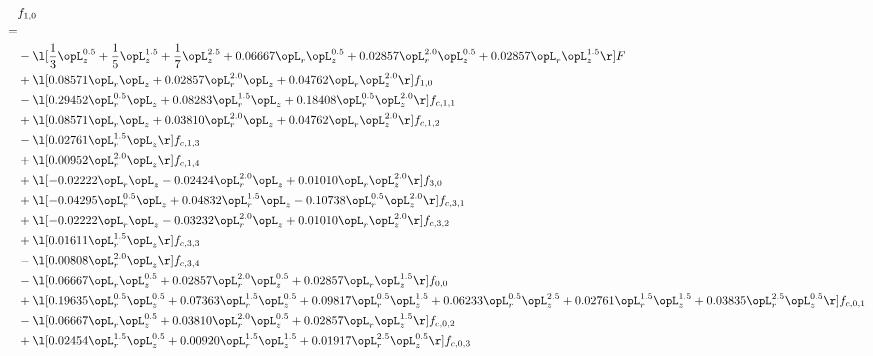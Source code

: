 \begin{alignat}{2} 
\label{eq:f_10_1} 
& f_{1,0} \nonumber \\ 
 = \\ 
& - \l[ \frac{1}{3} \opL_z^{0.5} + \frac{1}{5} \opL_z^{1.5} + \frac{1}{7} \opL_z^{2.5} +  0.06667 \opL_r \opL_z^{0.5} +  0.02857 \opL_r^{2.0} \opL_z^{0.5} +  0.02857 \opL_r \opL_z^{1.5}  \r] F \nonumber \\ 
& + \l[  0.08571 \opL_r \opL_z +  0.02857 \opL_r^{2.0} \opL_z +  0.04762 \opL_r \opL_z^{2.0}  \r] f_{1,0} \nonumber \\ 
& - \l[  0.29452 \opL_r^{0.5} \opL_z +  0.08283 \opL_r^{1.5} \opL_z +  0.18408 \opL_r^{0.5} \opL_z^{2.0}  \r] f_{c,1,1} \nonumber \\ 
& + \l[  0.08571 \opL_r \opL_z +  0.03810 \opL_r^{2.0} \opL_z +  0.04762 \opL_r \opL_z^{2.0}  \r] f_{c,1,2} \nonumber \\ 
& - \l[  0.02761 \opL_r^{1.5} \opL_z  \r] f_{c,1,3} \nonumber \\ 
& + \l[  0.00952 \opL_r^{2.0} \opL_z  \r] f_{c,1,4} \nonumber \\ 
& + \l[  -0.02222 \opL_r \opL_z   -0.02424 \opL_r^{2.0} \opL_z +  0.01010 \opL_r \opL_z^{2.0}  \r] f_{3,0} \nonumber \\ 
& + \l[  -0.04295 \opL_r^{0.5} \opL_z +  0.04832 \opL_r^{1.5} \opL_z   -0.10738 \opL_r^{0.5} \opL_z^{2.0}  \r] f_{c,3,1} \nonumber \\ 
& + \l[  -0.02222 \opL_r \opL_z   -0.03232 \opL_r^{2.0} \opL_z +  0.01010 \opL_r \opL_z^{2.0}  \r] f_{c,3,2} \nonumber \\ 
& + \l[  0.01611 \opL_r^{1.5} \opL_z  \r] f_{c,3,3} \nonumber \\ 
& - \l[  0.00808 \opL_r^{2.0} \opL_z  \r] f_{c,3,4} \nonumber \\ 
& - \l[  0.06667 \opL_r \opL_z^{0.5} +  0.02857 \opL_r^{2.0} \opL_z^{0.5} +  0.02857 \opL_r \opL_z^{1.5}  \r] f_{0,0} \nonumber \\ 
& + \l[  0.19635 \opL_r^{0.5} \opL_z^{0.5} +  0.07363 \opL_r^{1.5} \opL_z^{0.5} +  0.09817 \opL_r^{0.5} \opL_z^{1.5} +  0.06233 \opL_r^{0.5} \opL_z^{2.5} +  0.02761 \opL_r^{1.5} \opL_z^{1.5} +  0.03835 \opL_r^{2.5} \opL_z^{0.5}  \r] f_{c,0,1} \nonumber \\ 
& - \l[  0.06667 \opL_r \opL_z^{0.5} +  0.03810 \opL_r^{2.0} \opL_z^{0.5} +  0.02857 \opL_r \opL_z^{1.5}  \r] f_{c,0,2} \nonumber \\ 
& + \l[  0.02454 \opL_r^{1.5} \opL_z^{0.5} +  0.00920 \opL_r^{1.5} \opL_z^{1.5} +  0.01917 \opL_r^{2.5} \opL_z^{0.5}  \r] f_{c,0,3} \nonumber \\ 

\end{alignat}
